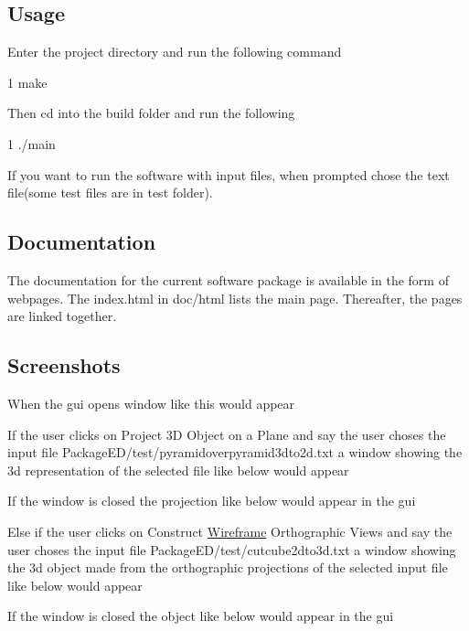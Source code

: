 \subsection*{Usage}

Enter the project directory and run the following command 
\begin{DoxyCode}
1 make
\end{DoxyCode}
 Then cd into the build folder and run the following 
\begin{DoxyCode}
1 ./main
\end{DoxyCode}
 If you want to run the software with input files, when prompted chose the text file(some test files are in test folder).

\subsection*{Documentation}

The documentation for the current software package is available in the form of webpages. The index.\+html in doc/html lists the main page. Thereafter, the pages are linked together. \subsection*{Screenshots}

When the gui opens window like this would appear 

If the user clicks on Project 3D Object on a Plane and say the user choses the input file Package\+E\+D/test/pyramidoverpyramid3dto2d.\+txt a window showing the 3d representation of the selected file like below would appear 

If the window is closed the projection like below would appear in the gui 

Else if the user clicks on Construct \hyperlink{class_wireframe}{Wireframe} Orthographic Views and say the user choses the input file Package\+E\+D/test/cutcube2dto3d.\+txt a window showing the 3d object made from the orthographic projections of the selected input file like below would appear 

If the window is closed the object like below would appear in the gui  
